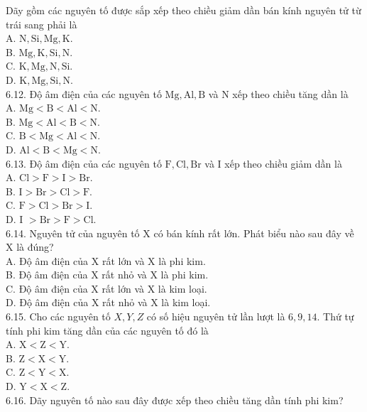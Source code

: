\documentclass[10pt]{article}
\begin{document}
Dãy gồm các nguyên tố được sắp xếp theo chiều giảm dần bán kính nguyên tử từ trái sang phải là\\
A. $\mathrm{N}, \mathrm{Si}, \mathrm{Mg}, \mathrm{K}$.\\
B. $\mathrm{Mg}, \mathrm{K}, \mathrm{Si}, \mathrm{N}$.\\
C. $\mathrm{K}, \mathrm{Mg}, \mathrm{N}, \mathrm{Si}$.\\
D. $\mathrm{K}, \mathrm{Mg}, \mathrm{Si}, \mathrm{N}$.\\
6.12. Độ âm điện của các nguyên tố $\mathrm{Mg}, \mathrm{Al}, \mathrm{B}$ và N xếp theo chiều tăng dần là\\
A. $\mathrm{Mg}<\mathrm{B}<\mathrm{Al}<\mathrm{N}$.\\
B. $\mathrm{Mg}<\mathrm{Al}<\mathrm{B}<\mathrm{N}$.\\
C. $\mathrm{B}<\mathrm{Mg}<\mathrm{Al}<\mathrm{N}$.\\
D. $\mathrm{Al}<\mathrm{B}<\mathrm{Mg}<\mathrm{N}$.\\
6.13. Độ âm điện của các nguyên tố $\mathrm{F}, \mathrm{Cl}, \mathrm{Br}$ và I xếp theo chiều giảm dần là\\
A. $\mathrm{Cl}>\mathrm{F}>\mathrm{I}>\mathrm{Br}$.\\
B. $\mathrm{I}>\mathrm{Br}>\mathrm{Cl}>\mathrm{F}$.\\
C. $\mathrm{F}>\mathrm{Cl}>\mathrm{Br}>\mathrm{I}$.\\
D. I $>\mathrm{Br}>\mathrm{F}>\mathrm{Cl}$.\\
6.14. Nguyên tử của nguyên tố X có bán kính rất lớn. Phát biểu nào sau đây về X là đúng?\\
A. Độ âm điện của X rất lớn và X là phi kim.\\
B. Độ âm điện của X rất nhỏ và X là phi kim.\\
C. Độ âm điện của X rất lớn và X là kim loại.\\
D. Độ âm điện của X rất nhỏ và X là kim loại.\\
6.15. Cho các nguyên tố $X, Y, Z$ có số hiệu nguyên tử lần lượt là $6,9,14$. Thứ tự tính phi kim tăng dần của các nguyên tố đó là\\
A. $\mathrm{X}<\mathrm{Z}<\mathrm{Y}$.\\
B. $\mathrm{Z}<\mathrm{X}<\mathrm{Y}$.\\
C. $\mathrm{Z}<\mathrm{Y}<\mathrm{X}$.\\
D. $\mathrm{Y}<\mathrm{X}<\mathrm{Z}$.\\
6.16. Dãy nguyên tố nào sau đây được xếp theo chiều tăng dần tính phi kim?\\
\end{document}
